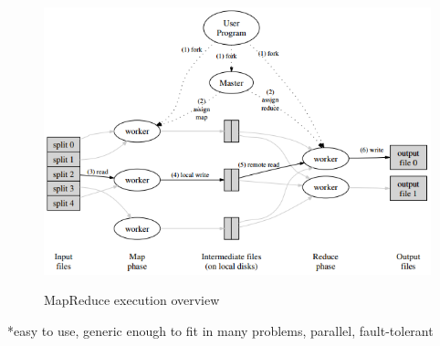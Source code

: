 \begin{figure}
\centering
\includegraphics[scale=0.8]{resources/images/Background/mapreduce_exec_overview.png}
\label{fig:mapreduce_execution_overview}
\caption{MapReduce execution overview \cite{Dean:2004:MSD:1251254.1251264}}
\end{figure}

*easy to use, generic enough to fit in many problems, parallel, fault-tolerant